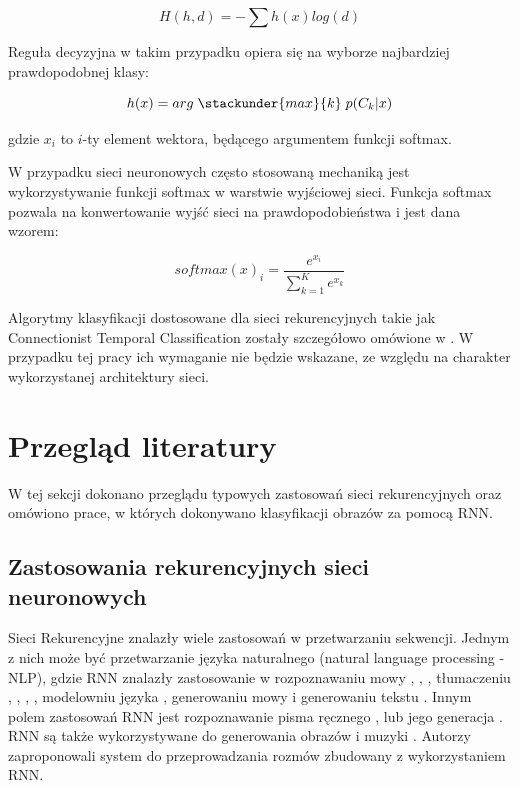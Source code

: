 \documentclass[oneside, mag]{mgr}
\begin{document}
\begin{equation}
	H(h,d) = - \sum h(x) log(d)
\end{equation}

Reguła decyzyjna w takim przypadku opiera się na wyborze najbardziej prawdopodobnej klasy:

\begin{equation}
	h(x) = arg \; \stackunder{max}{k} \; p(C_k | x)
\end{equation}

gdzie $x_i$ to $i$-ty element wektora, będącego argumentem funkcji softmax.

W przypadku sieci neuronowych często stosowaną mechaniką jest wykorzystywanie funkcji softmax w warstwie wyjściowej sieci. Funkcja softmax pozwala na konwertowanie wyjść sieci na prawdopodobieństwa i jest dana wzorem:

\begin{equation}
	softmax(x)_i = \frac{e^{x_i}}{\sum_{k=1}^{K} e^{x_k}}
\end{equation}

Algorytmy klasyfikacji dostosowane dla sieci rekurencyjnych takie jak Connectionist Temporal
Classification zostały szczegółowo omówione w \cite{graves-phd}. W przypadku tej pracy ich wymaganie nie będzie wskazane, ze względu na charakter wykorzystanej architektury sieci.

\section{Przegląd literatury}

W tej sekcji dokonano przeglądu typowych zastosowań sieci rekurencyjnych oraz omówiono prace, w których dokonywano klasyfikacji obrazów za pomocą RNN.

\subsection{Zastosowania rekurencyjnych sieci neuronowych}

Sieci Rekurencyjne znalazły wiele zastosowań w przetwarzaniu sekwencji. 
Jednym z nich może być przetwarzanie języka naturalnego (natural language processing - NLP), gdzie RNN znalazły zastosowanie w rozpoznawaniu mowy \cite{DBLP:journals/corr/abs-1303-5778}, \cite{speech_recognition}, \cite{speech_recognition1}, tłumaczeniu \cite{translate}, \cite{DBLP:journals/corr/ChoMGBSB14}, \cite{DBLP:journals/corr/BahdanauCB14}, \cite{DBLP:journals/corr/WuSCLNMKCGMKSJL16}, modelowniu języka \cite{DBLP:journals/corr/ChoMGBSB14}, generowaniu mowy \cite{DBLP:journals/corr/MehriKGKJSCB16} i generowaniu tekstu \cite{DBLP:journals/corr/Graves13} \cite{karpathy_RNN_blog}. 
Innym polem zastosowań RNN jest rozpoznawanie pisma ręcznego \cite{handwriting_recognition}, \cite{handwriting_recognition2} lub jego generacja \cite{DBLP:journals/corr/Graves13}.
RNN są także wykorzystywane do generowania obrazów \cite{DBLP:journals/corr/GregorDGW15} i muzyki \cite{DBLP:journals/corr/abs-1804-07300}.
Autorzy \cite{DBLP:journals/corr/VinyalsL15} zaproponowali system do przeprowadzania rozmów zbudowany z wykorzystaniem RNN.
\end{document}
